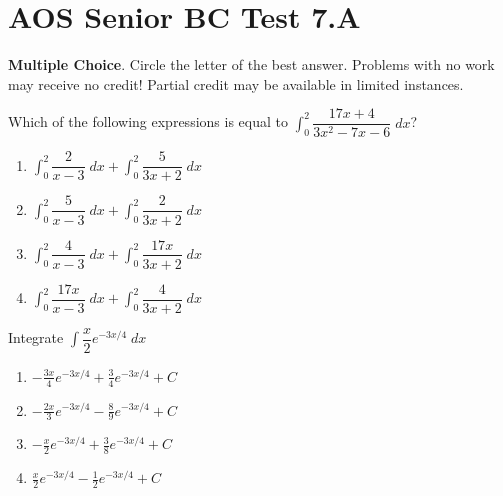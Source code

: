 \documentclass[
]{article}
\author{}
\date{}
\begin{document}
\pagestyle{empty}
\hypertarget{test-7}{%
\section{AOS Senior BC Test 7.A}\label{test-7}}

\noindent \textbf{Multiple Choice}. Circle the letter of the best answer. Problems
with no work may receive no credit! Partial credit may be available in limited
instances.

\begin{enumerate}
	\setlength{\itemsep}{1in}
\def\labelenumi{\arabic{enumi}.}
\begin{minipage}{\linewidth}
\item
  Which of the following expressions is equal to
  \(\displaystyle \int_0^2 \dfrac{17x+4}{3x^2-7x-6} \; dx\)?

	\vspace{2ex}
  \begin{enumerate}
		\setlength{\itemsep}{2ex}\def\labelenumi{\Alph{enumi}.}
\item
  \(\displaystyle \int_0^2 \dfrac{2}{x-3} \; dx + \displaystyle \int_0^2 \dfrac{5}{3x+2} \; dx\)
\item
  \(\displaystyle \int_0^2 \dfrac{5}{x-3} \; dx + \displaystyle \int_0^2 \dfrac{2}{3x+2} \; dx\)
\item
  \(\displaystyle \int_0^2 \dfrac{4}{x-3} \; dx + \displaystyle \int_0^2 \dfrac{17x}{3x+2} \; dx\)
\item
  \(\displaystyle \int_0^2 \dfrac{17x}{x-3} \; dx + \displaystyle \int_0^2 \dfrac{4}{3x+2} \; dx\)
\end{enumerate}
\vspace{0.25in}
\end{minipage}

\begin{minipage}{\linewidth}
\item
  Integrate \(\displaystyle \int \dfrac{x}{2} e^{-3x/4} \; dx\)

	\vspace{2ex}
  \begin{enumerate}
		\setlength{\itemsep}{2ex}		\def\labelenumi{\Alph{enumi}.}
    \item
    \(-\frac{3x}{4}e^{-3x/4} + \frac34 e^{-3x/4} + C\)
  \item
    \(-\frac{2x}{3}e^{-3x/4} - \frac89 e^{-3x/4} + C\)
  \item
    \(-\frac{x}{2}e^{-3x/4} + \frac38 e^{-3x/4} + C\)
  \item
    \(\frac{x}{2}e^{-3x/4} - \frac12 e^{-3x/4} + C\)
  \end{enumerate}
	\vspace{0.25in}


\end{minipage}
\end{enumerate}
\end{document}

